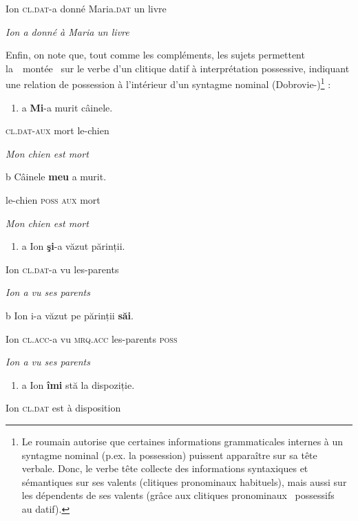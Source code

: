     Ion  \textsc{cl.dat-}a  donné  Maria.\textsc{dat}  un  livre

  \textit{Ion a donné à Maria un livre}

Enfin, on note que, tout comme les compléments, les sujets permettent la~{\guillemotleft}~montée~{\guillemotright} sur le verbe d'un clitique datif à interprétation possessive, indiquant une relation de possession à l'intérieur d'un syntagme nominal (Dobrovie-\citet{Sorin1987})\footnote{Le roumain autorise que certaines informations grammaticales internes à un syntagme nominal (p.ex. la possession) puissent apparaître sur sa tête verbale. Donc, le verbe tête collecte des informations syntaxiques et sémantiques sur ses valents (clitiques pronominaux habituels), mais aussi sur les dépendents de ses valents (grâce aux clitiques pronominaux {\guillemotleft}~possessifs~{\guillemotright} au datif). 
} : 


\begin{enumerate}
\item \label{bkm:Ref307435262}a  \textbf{Mi}-a  murit  câinele. 


\end{enumerate}
    \textsc{cl.dat-aux}  mort  le-chien

\textit{  Mon chien est mort}  

  b  Câinele  \textbf{meu}  a  murit.

    le-chien  \textsc{poss  aux}  mort

    \textit{Mon chien est mort}


\begin{enumerate}
\item \label{bkm:Ref307435265}a  Ion  \textbf{şi}-a  văzut  părinții. 


\end{enumerate}
Ion  \textsc{cl.dat-}a  vu  les-parents

{\itshape
  Ion a vu ses parents}

  b  Ion  i-a  văzut  pe  părinții  \textbf{săi}.

    Ion  \textsc{cl.acc-}a  vu  \textsc{mrq.acc}  les-parents  \textsc{poss}

    \textit{Ion a vu ses parents}


\begin{enumerate}
\item \label{bkm:Ref307435268}a  Ion  \textbf{îmi}  stă  la  dispoziție. 


\end{enumerate}
Ion\textsc{  cl.dat } est  à  disposition

